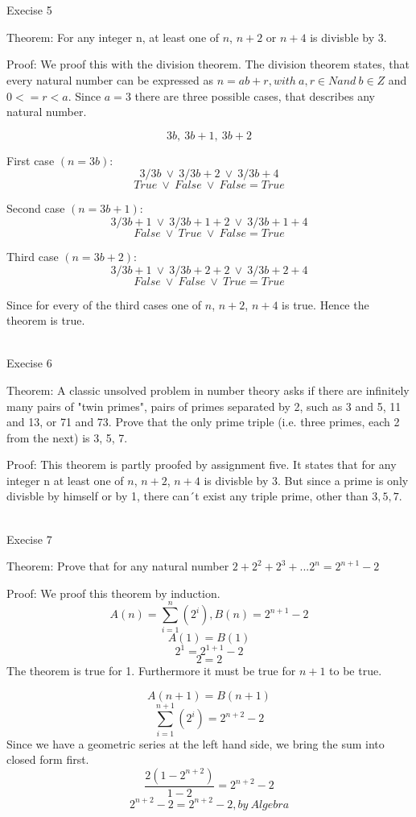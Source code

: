 \documentclass[12pt]{article}
\begin{document}
\
\\
\\

Execise 5

Theorem: For any integer n, at least one of $n$, $n+2$ or $n+4$ is divisble by 3.

Proof: We proof this with the division theorem. The division theorem states, that every natural number can be expressed as $n = ab + r, with\: a, r \in N and\: b \in Z$ and $0<=r<a$. Since $a = 3$ there are three possible cases, that describes any natural number.

\[3b,\: 3b + 1, \: 3b + 2\]

First case $(n = 3b)$:
\[3/3b\:\lor\:3/3b+2\:\lor\:3/3b+4\]
\[True\:\lor\:False\:\lor\:False = True\]

Second case $(n = 3b+1)$:
\[3/3b+1\:\lor\:3/3b+1+2\:\lor\:3/3b+1+4\]
\[False\:\lor\:True\:\lor\:False = True\]

Third case $(n = 3b+2)$:
\[3/3b+1\:\lor\:3/3b+2+2\:\lor\:3/3b+2+4\]
\[False\:\lor\:False\:\lor\:True = True\]

Since for every of the third cases one of $n$, $n+2$, $n+4$ is true. Hence the theorem is true.


\
\\

Execise 6

Theorem: A classic unsolved problem in number theory asks if there are infinitely many pairs of "twin primes", pairs of primes separated by 2, such as 3 and 5, 11 and 13, or 71 and 73. Prove that the only prime triple (i.e. three primes, each 2 from the next) is 3, 5, 7.

Proof: This theorem is partly proofed by assignment five. It states that for any integer n at least one of $n$, $n+2$, $n+4$ is divisble by 3. But since a prime is only divisble by himself or by 1, there can´t exist any triple prime, other than $3,5,7$.


\
\\

Execise 7

Theorem: Prove that for any natural number $2+2^2+2^3+...2^n = 2^{n+1} -2$

Proof: We proof this theorem by induction. 
\[A(n) = \sum_{i=1}^{n}(2^i), B(n) = 2^{n+1}-2\]
\[A(1) = B(1)\]
\[2^1 = 2^{1+1} -2 \]
\[2 = 2 \]
The theorem is true for 1. Furthermore it must be true for $n+1$ to be true.

\[A(n+1) = B(n+1)\]
\[\sum_{i=1}^{n+1}(2^i) = 2^{n+2}-2 \]
Since we have a geometric series at the left hand side, we bring the sum into closed form first.
\[\frac{2(1-2^{n+2})}{1-2} = 2^{n+2}-2 \]
\[2^{n+2}-2 = 2^{n+2}-2, by\: Algebra \]
\end{document}

